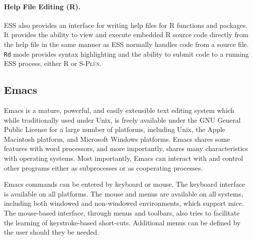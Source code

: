 \documentclass{article}
\newcommand*{\Splus}{\textsc{S-Plus}}
\newcommand{\stexttt}[1]{{\small\texttt{#1}}}
\begin{document}
\paragraph{Help File Editing (R).}
ESS also provides an interface for writing help files for R functions
and packages.  It provides the ability to view and execute embedded R
source code directly from the help file in the same manner as ESS
normally handles code from a source file.  \stexttt{Rd} mode provides
syntax highlighting and the ability to submit code to a running ESS
process, either R or \Splus.

\subsection{Emacs}
\label{sec:ESS:emacs}

Emacs \citep{RMS:2000} is a mature, powerful, and easily extensible
text editing system which while traditionally used under Unix, is
freely available under the GNU General Public License for a large
number of platforms, including Unix, the Apple Macintosh platform, and
Microsoft Windows platforms.  Emacs shares some features with word
processors, and more importantly, shares many characteristics with
operating systems.  Most importantly, Emacs can interact with and
control other programs either as subprocesses or as cooperating
processes.

Emacs commands can be entered by keyboard or mouse.  The keyboard
interface is available on all platforms.  The mouse and menus are
available on all systems, including both windowed and non-windowed
environments, which support mice.  The mouse-based interface, through
menus and toolbars, also tries to facilitate the learning of
keystroke-based short-cuts.  Additional menus can be defined by the
user should they be needed.

\end{document}
